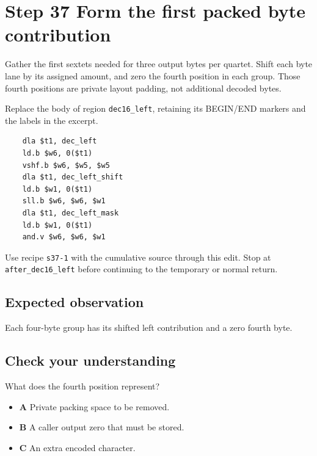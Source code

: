 \section{Step 37 Form the first packed byte contribution}\label{base64-s37}

Gather the first sextets needed for three output bytes per quartet. Shift each byte lane by its assigned amount, and zero the fourth position in each group. Those fourth positions are private layout padding, not additional decoded bytes.

Replace the body of region \texttt{dec16\_left}, retaining its BEGIN/END markers and the labels in the excerpt.

\begin{verbatim}
    dla $t1, dec_left
    ld.b $w6, 0($t1)
    vshf.b $w6, $w5, $w5
    dla $t1, dec_left_shift
    ld.b $w1, 0($t1)
    sll.b $w6, $w6, $w1
    dla $t1, dec_left_mask
    ld.b $w1, 0($t1)
    and.v $w6, $w6, $w1
\end{verbatim}

Use recipe \texttt{s37-1} with the cumulative source through this edit. Stop at \texttt{after\_dec16\_left} before continuing to the temporary or normal return.

\subsection{Expected observation}
Each four-byte group has its shifted left contribution and a zero fourth byte.

\subsection{Check your understanding}
What does the fourth position represent?

\begin{itemize}
\item \textbf{A} Private packing space to be removed.
\item \textbf{B} A caller output zero that must be stored.
\item \textbf{C} An extra encoded character.
\end{itemize}
